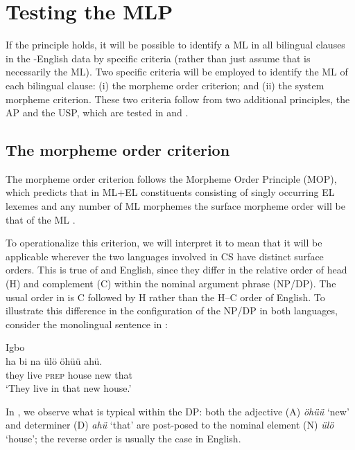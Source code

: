 \documentclass[output=paper]{langsci/langscibook}
\begin{document}
\section{Testing the MLP}\label{sec:ihemere:5}

If the principle holds, it will be possible to identify a ML in all bilingual clauses in the -English data by specific criteria (rather than just assume that  is necessarily the ML). Two specific criteria will be employed to identify the ML of each bilingual clause: (i) the morpheme order criterion; and (ii) the system morpheme criterion. These two criteria follow from two additional principles, the AP and the USP, which are tested in  and .

\subsection{The morpheme order criterion}\label{sec:ihemere:5.1}

The morpheme order criterion follows the Morpheme Order Principle (MOP), which predicts that in ML+EL constituents consisting of singly occurring EL lexemes and any number of ML morphemes the surface morpheme order will be that of the ML \citep[59]{MyersScotton2002}. 

To operationalize this criterion, we will interpret it to mean that it will be applicable wherever the two languages involved in CS have distinct surface orders. This is true of  and English, since they differ in the relative order of head (H) and complement (C) within the nominal argument phrase (NP/DP). The usual order in  is C followed by H rather than the H–C order of English. To illustrate this difference in the configuration of the NP/DP in both languages, consider the monolingual  sentence in :

\ea\label{ex:ihemere:9}
{Igbo}\\
\gll ha    bi  na   ülö  öhüü  ahü.\\
     they  live  \textsc{prep}  house  new  that\\
\glt ‘They live in that new house.’
\z

In , we observe what is typical within the  DP: both the adjective (A) \textit{öhüü} ‘new’ and determiner (D) \textit{ahü} ‘that’ are post-posed to the nominal element (N) \textit{ülö} ‘house’; the reverse order is usually the case in English. 
\end{document}
